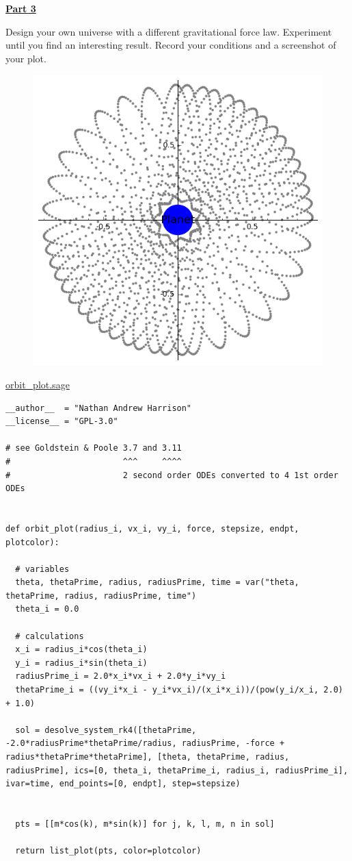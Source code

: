 \underline{\textbf{Part 3}} \par
Design your own universe with a different gravitational force law.
Experiment until you find an interesting result.
Record your conditions and a screenshot of your plot.
%
\begin{figure}[H]
\includegraphics[scale=0.60]{figures/orbits/part3.png}
\end{figure}

\underline{orbit\_plot.sage} \par
\begin{verbatim}
__author__  = "Nathan Andrew Harrison"
__license__ = "GPL-3.0"

# see Goldstein & Poole 3.7 and 3.11
#                       ^^^     ^^^^
#                       2 second order ODEs converted to 4 1st order ODEs


def orbit_plot(radius_i, vx_i, vy_i, force, stepsize, endpt, plotcolor):

  # variables
  theta, thetaPrime, radius, radiusPrime, time = var("theta, thetaPrime, radius, radiusPrime, time")
  theta_i = 0.0
  
  # calculations
  x_i = radius_i*cos(theta_i)
  y_i = radius_i*sin(theta_i)
  radiusPrime_i = 2.0*x_i*vx_i + 2.0*y_i*vy_i
  thetaPrime_i = ((vy_i*x_i - y_i*vx_i)/(x_i*x_i))/(pow(y_i/x_i, 2.0) + 1.0)
  
  sol = desolve_system_rk4([thetaPrime, -2.0*radiusPrime*thetaPrime/radius, radiusPrime, -force + radius*thetaPrime*thetaPrime], [theta, thetaPrime, radius, radiusPrime], ics=[0, theta_i, thetaPrime_i, radius_i, radiusPrime_i], ivar=time, end_points=[0, endpt], step=stepsize)
  
  
  pts = [[m*cos(k), m*sin(k)] for j, k, l, m, n in sol]
  
  return list_plot(pts, color=plotcolor)
\end{verbatim}

\pagebreak \clearpage
